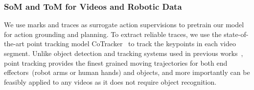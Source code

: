 \subsubsection{SoM and ToM for Videos and Robotic Data}
\label{sec:main_tom}

We use marks and traces as surrogate action supervisions to pretrain our \magma model for action grounding and planning. To extract reliable traces, we use the state-of-the-art point tracking model CoTracker~\cite{karaev2023cotracker} to track the keypoints in each video segment. Unlike object detection and tracking systems used in previous works~\cite{ravi2024sam2segmentimages,niu2024llarva,li2025hamsterhierarchicalactionmodels}, point tracking provides the finest grained moving trajectories for both end effectors~(robot arms or human hands) and objects, and more importantly can be feasibly applied to any videos as it does not require object recognition.

